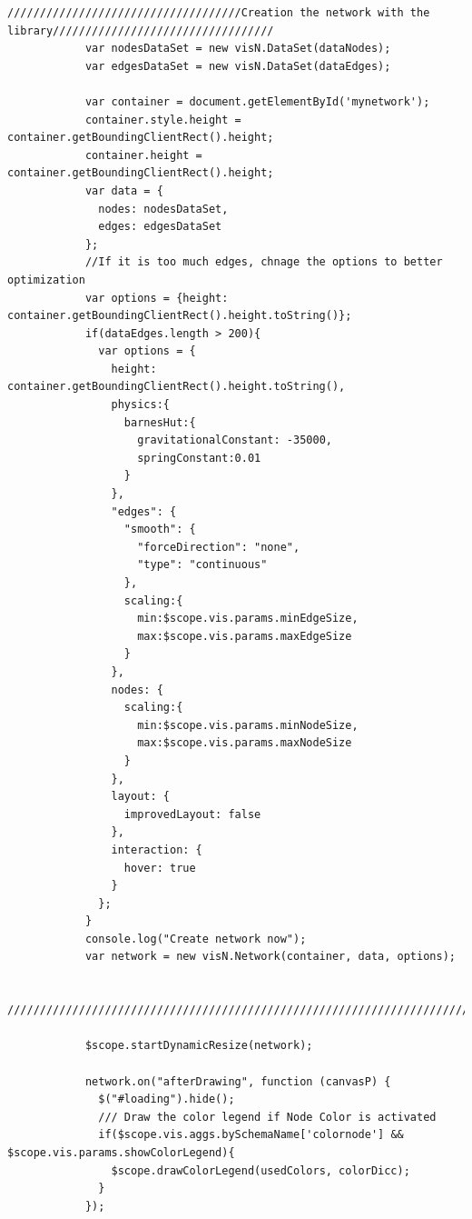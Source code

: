\documentclass[a4paper, 12pt]{book}
\begin{document}
\begin{lstlisting}[frame=single]
            ////////////////////////////////////Creation the network with the library//////////////////////////////////
            var nodesDataSet = new visN.DataSet(dataNodes);
            var edgesDataSet = new visN.DataSet(dataEdges);

            var container = document.getElementById('mynetwork');
            container.style.height = container.getBoundingClientRect().height;
            container.height = container.getBoundingClientRect().height;
            var data = {
              nodes: nodesDataSet,
              edges: edgesDataSet
            };
            //If it is too much edges, chnage the options to better optimization
            var options = {height: container.getBoundingClientRect().height.toString()};
            if(dataEdges.length > 200){
              var options = {
                height: container.getBoundingClientRect().height.toString(),
                physics:{
                  barnesHut:{
                    gravitationalConstant: -35000,
                    springConstant:0.01
                  }
                },
                "edges": {
                  "smooth": {
                    "forceDirection": "none",
                    "type": "continuous"
                  },
                  scaling:{
                    min:$scope.vis.params.minEdgeSize,
                    max:$scope.vis.params.maxEdgeSize
                  }
                },
                nodes: {
                  scaling:{
                    min:$scope.vis.params.minNodeSize,
                    max:$scope.vis.params.maxNodeSize
                  }
                },
                layout: {
                  improvedLayout: false
                },
                interaction: {
                  hover: true
                }
              };
            }
            console.log("Create network now");
            var network = new visN.Network(container, data, options);

            ////////////////////////////////////////////////////////////////////////////////////////////////////////////

            $scope.startDynamicResize(network);

            network.on("afterDrawing", function (canvasP) {
              $("#loading").hide();
              /// Draw the color legend if Node Color is activated
              if($scope.vis.aggs.bySchemaName['colornode'] && $scope.vis.params.showColorLegend){
                $scope.drawColorLegend(usedColors, colorDicc);
              }
            });


\end{lstlisting}
\end{document}
